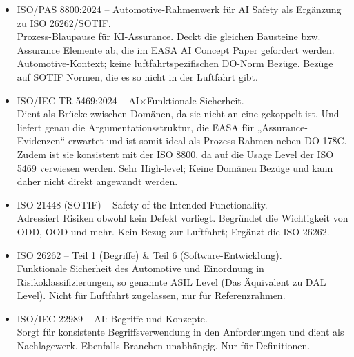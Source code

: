 \begin{itemize}
  \item ISO/PAS 8800:2024 – Automotive-Rahmenwerk für AI Safety als Ergänzung zu ISO 26262/SOTIF.\\
      {Prozess-Blaupause für KI-Assurance. Deckt die gleichen Bausteine bzw. Assurance Elemente ab, die im EASA AI Concept Paper gefordert werden.}
      {Automotive-Kontext; keine luftfahrtspezifischen DO-Norm Bezüge. Bezüge auf SOTIF Normen, die es so nicht in der Luftfahrt gibt.}

  \item ISO/IEC TR 5469:2024 – AI$\times$Funktionale Sicherheit.\\
      {Dient als Brücke zwischen Domänen, da sie nicht an eine gekoppelt ist. Und liefert genau die Argumentationsstruktur, die EASA für „Assurance-Evidenzen“ erwartet und ist somit ideal als Prozess-Rahmen neben DO-178C.
      Zudem ist sie konsistent mit der ISO 8800, da auf die Usage Level der ISO 5469 verwiesen werden.}
      {Sehr High-level; Keine Domänen Bezüge und kann daher nicht direkt angewandt werden.}

  \item ISO 21448 (SOTIF) – Safety of the Intended Functionality.\\
      {Adressiert Risiken obwohl kein Defekt vorliegt. Begründet die Wichtigkeit von ODD, OOD und mehr.}
      {Kein Bezug zur Luftfahrt; Ergänzt die ISO 26262.}

  \item ISO 26262 – Teil 1 (Begriffe) \& Teil 6 (Software-Entwicklung).\\
      {Funktionale Sicherheit des Automotive und Einordnung in Risikoklassifizierungen, so genannte ASIL Level (Das Äquivalent zu DAL Level).}
      {Nicht für Luftfahrt zugelassen, nur für Referenzrahmen.}

  \item ISO/IEC 22989 – AI: Begriffe und Konzepte.\\
      {Sorgt für konsistente Begriffsverwendung in den Anforderungen und dient als Nachlagewerk. Ebenfalls Branchen unabhängig.}
      {Nur für Definitionen.}


\end{itemize}
